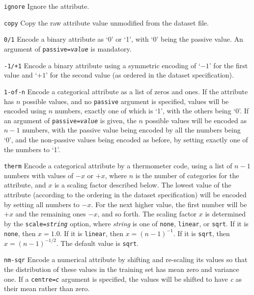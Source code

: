 \begin{list}{}{\setlength{\labelwidth}{0.7in} \setlength{\labelsep}{0.1in}%
\setlength{\leftmargin}{1.1in}}

\item[{\tt ignore}\hfill] 
Ignore the attribute.

\item[{\tt copy}\hfill] 
Copy the raw attribute value unmodified from the dataset file.

\item[{\tt 0/1}\hfill] 
Encode a binary attribute as `0' or `1', with `0' being the passive
value.  An argument of \texttt{passive={\rm\em value}} is mandatory.

\item[{\tt -1/+1}\hfill] 
Encode a binary attribute using a symmetric encoding of `$-1$' for the
first value and `$+1$' for the second value (as ordered in the dataset
specification).

\item[{\tt 1-of-n}\hfill] 
Encode a categorical attribute as a list of zeros and ones.  If
the attribute has $n$ possible values, and no \texttt{passive} argument
is specified, values will be encoded using $n$ numbers, exactly one 
of which is `1', with the others being `0'.  If an argument of 
\texttt{passive={\rm\em value}} is given, the $n$ possible
values will be encoded as $n\!-\!1$ numbers, with the passive value
being encoded by all the numbers being `0', and the non-passive values
being encoded as before, by setting exactly one of the numbers to `1'.

\item[{\tt therm}\hfill] 
Encode a categorical attribute by a thermometer code, using a list of
$n\!-\!1$ numbers with values of $-x$ or $+x$, where $n$ is the number
of categories for the attribute, and $x$ is a scaling factor
described below.  The lowest value of the attribute (according to the
ordering in the dataset specification) will be encoded by setting all
numbers to $-x$.  For the next higher value, the first number will be
$+x$ and the remaining ones $-x$, and so forth.  The scaling factor
$x$ is determined by the \texttt{scale=\textrm{\textsl{string}}}
option, where \textrm{\textsl{string}} is one of \texttt{none},
\texttt{linear}, or \texttt{sqrt}.  If it is \texttt{none}, then $x=1.0$.
If it is \texttt{linear}, then $x=(n-1)^{-1}$.  If it is
\texttt{sqrt}, then $x=(n-1)^{-1/2}$. The default value is
\texttt{sqrt}.

\item[{\tt nm-sqr}\hfill] 
Encode a numerical attribute by shifting and re-scaling its values so
that the distribution of these values in the training set has mean
zero and variance one.  If a \texttt{centre={\rm\em c}} argument is
specified, the values will be shifted to have \emph{c} as their mean
rather than zero.


\end{list}
